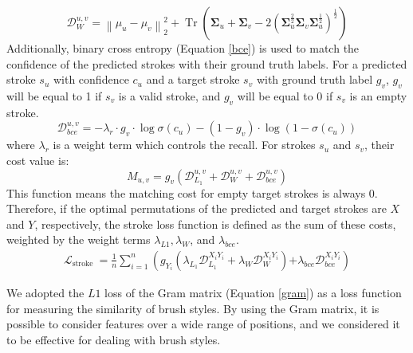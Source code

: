 \begin{equation}
    \label{Wasserstein}
    \mathcal{D}_W^{u, v}=\left\|\mu_u-\mu_v\right\|_2^2+\operatorname{Tr}\left(\boldsymbol{\Sigma}_u+\boldsymbol{\Sigma}_v-2\left(\boldsymbol{\Sigma}_u^{\frac{2}{2}} \boldsymbol{\Sigma}_v \boldsymbol{\Sigma}_u^{\frac{1}{2}}\right)^{\frac{1}{2}}\right)
\end{equation}
Additionally, binary cross entropy (Equation \eqref{bce}) is used to match the confidence of the
predicted strokes with their ground truth labels. 
For a predicted stroke $s_u$ with confidence $c_u$ and a target stroke $s_v$ 
with ground truth label $g_v$,  $g_v$ will be equal to 1 if $s_v$ is a valid 
stroke, and $g_v$ will be equal to 0 if $s_v$ is an empty stroke.
\begin{equation}
    \label{bce}
    \mathcal{D}_{b c e}^{u, v}=-\lambda_r \cdot g_v \cdot \log \sigma\left(c_u\right)-\left(1-g_v\right) \cdot \log \left(1-\sigma\left(c_u\right)\right)
\end{equation}
where $\lambda_r$ is a weight term which controls the recall.
For strokes $s_u$ and $s_v$, their cost value is:
\begin{equation}
    M_{u, v}=g_v\left(\mathcal{D}_{L_1}^{u, v}+\mathcal{D}_W^{u, v}+\mathcal{D}_{b c e}^{u, v}\right)
\end{equation}
This function means the matching cost for empty target strokes is always 0.
Therefore, if the optimal permutations of the predicted and target strokes are $X$ and $Y$, 
respectively, the stroke loss function is defined as the sum of these costs, 
weighted by the weight terms  $\lambda_{L1}, \lambda_W$, and $\lambda_{bce}$.
\begin{equation}
    \begin{gathered}
        \mathcal{L}_{\text {stroke }}=\frac{1}{n} \sum_{i=1}^n\left(g_{Y_i}\left(\lambda_{L_1} \mathcal{D}_{L_1}^{X_i Y_i}+\lambda_W \mathcal{D}_W^{X_i Y_i}\right)\right.
        \left.+\lambda_{b c e} \mathcal{D}_{b c e}^{X_i Y_i}\right)
        \end{gathered}
\end{equation}

We adopted the $L1$ loss of the Gram matrix (Equation \eqref{gram}) as a loss function for measuring 
the similarity of brush styles.
By using the Gram matrix, it is possible to consider features over a wide range 
of positions, and we considered it to be effective for dealing with brush styles.


